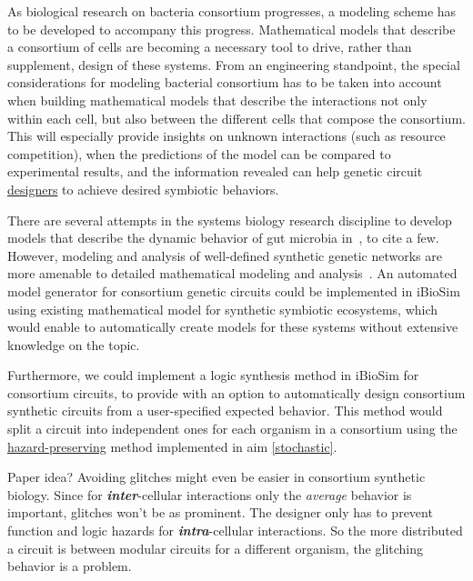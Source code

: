 \documentclass[12pt]{article}
\begin{document}
As biological research on bacteria consortium progresses, a modeling scheme has to be developed to accompany this progress. Mathematical models that describe a consortium of cells are becoming a necessary tool to drive, rather than supplement, design of these systems. From an engineering standpoint, the special considerations for modeling bacterial consortium has to be taken into account when building mathematical models that describe the interactions not only within each cell, but also between the different cells that compose the consortium. This will especially provide insights on unknown interactions (such as resource competition), when the predictions of the model can be compared to experimental results, and the information revealed can help genetic circuit \hyperlink{design}{designers} to achieve desired symbiotic behaviors.

There are several attempts in the systems biology research discipline to develop models that describe the dynamic behavior of gut microbia in~\cite{faust_MicrobialConsortiumDesign_2019,gould_MicrobiomeInteractionsShape_2018,pinto_ModelingMetabolicInteractions_2017,venturelli_DecipheringMicrobialInteractions_2018,white_MultiscaleModelingBiomedical_2009}, to cite a few. However, modeling and analysis of well-defined synthetic genetic networks are more amenable to detailed mathematical modeling and analysis~\cite{kambam_DesignMathematicalModelling_2008}.  An automated model generator for consortium genetic circuits could be implemented in iBioSim using existing mathematical model for synthetic symbiotic ecosystems, which would enable to automatically create models for these systems without extensive knowledge on the topic.

Furthermore, we could implement a logic synthesis method in iBioSim for consortium circuits, to provide with an option to automatically design consortium synthetic circuits from a user-specified expected behavior. This method would split a circuit into independent ones for each organism in a consortium using the \hyperlink{hazardDesign}{hazard-preserving} method implemented in aim \ref{stochastic}. 

Paper idea?
Avoiding glitches might even be easier in consortium synthetic biology. Since for \textit{\textbf{inter}}-cellular interactions only the \emph{average} behavior is important, glitches won't be as prominent. The designer only has to prevent function and logic hazards for \textit{\textbf{intra}}-cellular interactions. So the more distributed a circuit is between modular circuits for a different organism, the glitching behavior is a problem.
\end{document}
